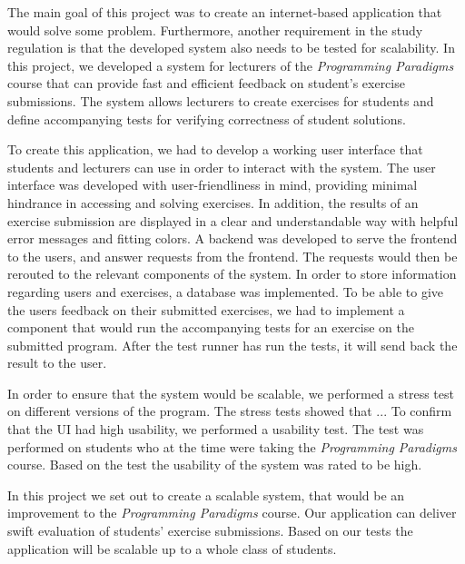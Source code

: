 The main goal of this project was to create an internet-based application that would solve some problem.
Furthermore, another requirement in the study regulation is that the developed system also needs to be tested for scalability. 
In this project, we developed a system for lecturers of the \textit{Programming Paradigms} course that can provide fast and efficient feedback on student's exercise submissions.
The system allows lecturers to create exercises for students and define accompanying tests for verifying correctness of student solutions.

To create this application, we had to develop a working user interface that students and lecturers can use in order to interact with the system. 
The user interface was developed with user-friendliness in mind, providing minimal hindrance in accessing and solving exercises. 
In addition, the results of an exercise submission are displayed in a clear and understandable way with helpful error messages and fitting colors.
A backend was developed to serve the frontend to the users, and answer requests from the frontend. 
The requests would then be rerouted to the relevant components of the system. 
In order to store information regarding users and exercises, a database was implemented.
To be able to give the users feedback on their submitted exercises, we had to implement a component that would run the accompanying tests for an exercise on the submitted program. 
After the test runner has run the tests, it will send back the result to the user.

In order to ensure that the system would be scalable, we performed a stress test on different versions of the program. 
The stress tests showed that ... 
To confirm that the UI had high usability, we performed a usability test.
The test was performed on students who at the time were taking the \textit{Programming Paradigms} course.
Based on the test the usability of the system was rated to be high.  

In this project we set out to create a scalable system, that would be an improvement to the \textit{Programming Paradigms} course.
Our application can deliver swift evaluation of students' exercise submissions. Based on our tests the application will be scalable up to a whole class of students.
